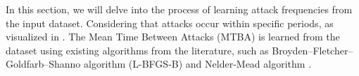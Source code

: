 In this section, we will delve into the process of learning attack frequencies from the input dataset. Considering that attacks occur within specific periods, as visualized in \fig{}. The Mean Time Between Attacks (MTBA) is learned from the dataset using existing algorithms from the literature, such as   Broyden–Fletcher–Goldfarb–Shanno algorithm (L-BFGS-B) \cite{} and Nelder-Mead algorithm \cite{}.